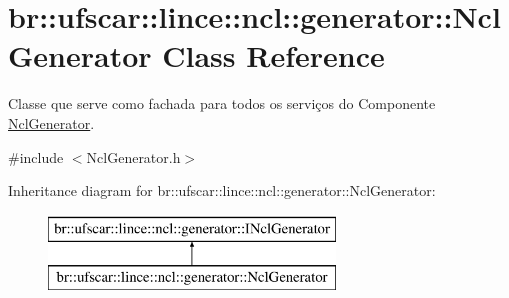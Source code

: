\hypertarget{classbr_1_1ufscar_1_1lince_1_1ncl_1_1generator_1_1NclGenerator}{
\section{br::ufscar::lince::ncl::generator::NclGenerator Class Reference}
\label{classbr_1_1ufscar_1_1lince_1_1ncl_1_1generator_1_1NclGenerator}
}


Classe que serve como fachada para todos os serviços do Componente \hyperlink{classbr_1_1ufscar_1_1lince_1_1ncl_1_1generator_1_1NclGenerator}{NclGenerator}.  




{\ttfamily \#include $<$NclGenerator.h$>$}

Inheritance diagram for br::ufscar::lince::ncl::generator::NclGenerator:\begin{figure}[H]
\begin{center}
\leavevmode
\includegraphics[height=2cm]{classbr_1_1ufscar_1_1lince_1_1ncl_1_1generator_1_1NclGenerator}
\end{center}
\end{figure}
